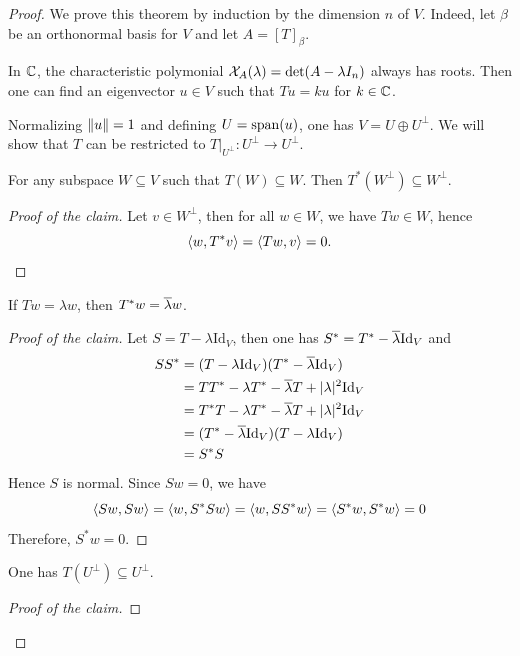 ﻿\documentclass[12pt]{article}
\begin{document}
\begin{proof}
    We prove this theorem by induction by the dimension $n$ of $V$. Indeed, let $\beta$ be an orthonormal basis for $V$ and let $ A = [T]_{\beta}$.
    
    In $\mathbb{C}$, the characteristic polymonial $\mathcal{X}_A(\lambda) = \det(A - \lambda I_n)$ always has roots. Then one can find an eigenvector $u \in V$ such that $Tu = ku$ for $k \in \mathbb{C}$. 

    Normalizing $\left\lVert u \right\rVert = 1$ and defining $U = \mathrm{span}(u)$, one has $V = U \oplus U^\bot$. We will show that $T$ can be restricted to $T|_{U^\bot}: U^\bot \to U^\bot$.
    \begin{claim}
        For any subspace $W \subseteq V$ such that $T(W) \subseteq W$. Then $T^*(W^\bot) \subseteq W^\bot$.
    \end{claim}
    \begin{proof}[Proof of the claim]
        Let $v \in W^\bot$, then for all $w \in W$, we have $Tw \in W$, hence
        \[
            \left\langle w, T^*v \right\rangle = \left\langle Tw, v \right\rangle = 0.
        \]
    \end{proof}
    \begin{claim}
        If $Tw = \lambda w$, then $T^* w = \overline{\lambda}w$.
    \end{claim}
    \begin{proof}[Proof of the claim]
        Let $S = T - \lambda \mathrm{Id}_V$, then one has $S^* = T^* - \overline{\lambda}\mathrm{Id}_V$ and 
        \begin{align*}
            SS^* &= (T - \lambda \mathrm{Id}_V)(T^* - \overline{\lambda}\mathrm{Id}_V)\\
            &= TT^* - \lambda T^* - \overline{\lambda}T + |\lambda|^2 \mathrm{Id}_V\\
            &= T^*T - \lambda T^* - \overline{\lambda}T + |\lambda|^2 \mathrm{Id}_V\\
            &= (T^* - \overline{\lambda}\mathrm{Id}_V)(T - \lambda \mathrm{Id}_V)\\
            &= S^*S
        \end{align*}
        Hence $S$ is normal. Since $Sw = 0$, we have 
        \[
            \left\langle Sw,Sw \right\rangle = \left\langle w, S^*Sw \right\rangle = \left\langle w, SS^*w \right\rangle = \left\langle S^*w,S^*w \right\rangle  = 0
        \]
        Therefore, $S^*w = 0$.
    \end{proof}
    \begin{claim}
        One has $T(U^\bot) \subseteq U^\bot$.
    \end{claim}
    \begin{proof}[Proof of the claim]

\end{proof}
\end{proof}
\end{document}
